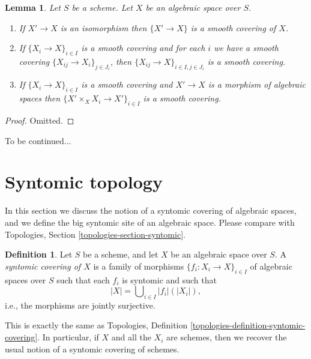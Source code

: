 \documentclass{stacks-project}
\theoremstyle{plain}
\newtheorem{lemma}[subsection]{Lemma}
\theoremstyle{definition}
\newtheorem{definition}[subsection]{Definition}
\theoremstyle{remark}
\numberwithin{equation}{subsection}
\begin{document}
\begin{lemma}
\label{lemma-smooth}
Let $S$ be a scheme.
Let $X$ be an algebraic space over $S$.
\begin{enumerate}
\item If $X' \to X$ is an isomorphism then $\{X' \to X\}$
is a smooth covering of $X$.
\item If $\{X_i \to X\}_{i\in I}$ is a smooth covering and for each
$i$ we have a smooth covering $\{X_{ij} \to X_i\}_{j\in J_i}$, then
$\{X_{ij} \to X\}_{i \in I, j\in J_i}$ is a smooth covering.
\item If $\{X_i \to X\}_{i\in I}$ is a smooth covering
and $X' \to X$ is a morphism of algebraic spaces then
$\{X' \times_X X_i \to X'\}_{i\in I}$ is a smooth covering.
\end{enumerate}
\end{lemma}

\begin{proof}
Omitted.
\end{proof}

\noindent
To be continued...









\section{Syntomic topology}
\label{section-syntomic}

\noindent
In this section we discuss the notion of a syntomic covering of
algebraic spaces, and we define the big syntomic site of an
algebraic space. Please compare with
Topologies, Section \ref{topologies-section-syntomic}.

\begin{definition}
\label{definition-syntomic-covering}
Let $S$ be a scheme, and let $X$ be an algebraic space over $S$.
A {\it syntomic covering of $X$} is a family of morphisms
$\{f_i : X_i \to X\}_{i \in I}$ of algebraic spaces over $S$
such that each $f_i$ is syntomic
and such that
$$
|X| = \bigcup\nolimits_{i \in I} |f_i|(|X_i|),
$$
i.e., the morphisms are jointly surjective.
\end{definition}

\noindent
This is exactly the same as
Topologies, Definition \ref{topologies-definition-syntomic-covering}.
In particular, if $X$ and all the $X_i$ are schemes, then we recover the
usual notion of a syntomic covering of schemes.
\end{document}
